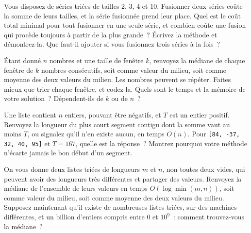 \begin{question}\label{iq:iv3:algorithms:68}
Vous disposez de séries triées de tailles 2, 3, 4 et 10. Fusionner deux séries coûte la somme de leurs tailles, et la série fusionnée prend leur place. Quel est le coût total minimal pour tout fusionner en une seule série, et combien coûte une fusion qui procède toujours à partir de la plus grande~? Écrivez la méthode et démontrez-la. Que faut-il ajouter si vous fusionnez trois séries à la fois~?
\end{question}

\begin{question}\label{iq:iv3:algorithms:69}
Étant donné $n$ nombres et une taille de fenêtre $k$, renvoyez la médiane de chaque fenêtre de $k$ nombres consécutifs, soit comme valeur du milieu, soit comme moyenne des deux valeurs du milieu. Les nombres peuvent se répéter. Faites mieux que trier chaque fenêtre, et codez-la. Quels sont le temps et la mémoire de votre solution~? Dépendent-ils de $k$ ou de $n$~?
\end{question}

\begin{question}\label{iq:iv3:algorithms:70}
Une liste contient $n$ entiers, pouvant être négatifs, et $T$ est un entier positif. Renvoyez la longueur du plus court segment contigu dont la somme vaut au moins $T$, ou signalez qu'il n'en existe aucun, en temps $O(n)$. Pour \texttt{[84, -37, 32, 40, 95]} et $T = 167$, quelle est la réponse~? Montrez pourquoi votre méthode n'écarte jamais le bon début d'un segment.
\end{question}

\begin{question}\label{iq:iv3:algorithms:71}
On vous donne deux listes triées de longueurs $m$ et $n$, non toutes deux vides, qui peuvent avoir des longueurs très différentes et partager des valeurs. Renvoyez la médiane de l'ensemble de leurs valeurs en temps $O(\log \min(m, n))$, soit comme valeur du milieu, soit comme moyenne des deux valeurs du milieu. Supposez maintenant qu'il existe de nombreuses listes triées, sur des machines différentes, et un billion d'entiers compris entre 0 et $10^9$~: comment trouvez-vous la médiane~?
\end{question}

